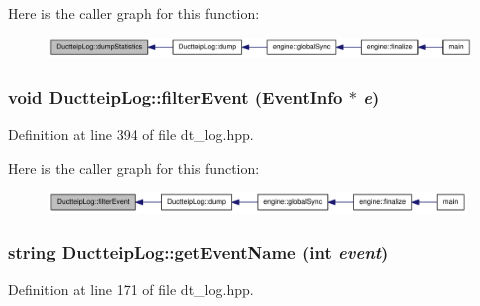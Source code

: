 Here is the caller graph for this function:\nopagebreak
\begin{figure}[H]
\begin{center}
\leavevmode
\includegraphics[width=324pt]{class_ductteip_log_a7f6153345afe4d8ecf0e4f066c77fb33_icgraph}
\end{center}
\end{figure}
\hypertarget{class_ductteip_log_a91792b3bdcea6336ee43c7da8872879f}{
\subsubsection[{filterEvent}]{\setlength{\rightskip}{0pt plus 5cm}void DuctteipLog::filterEvent ({\bf EventInfo} $\ast$ {\em e})}}
\label{class_ductteip_log_a91792b3bdcea6336ee43c7da8872879f}


Definition at line 394 of file dt\_\-log.hpp.

Here is the caller graph for this function:\nopagebreak
\begin{figure}[H]
\begin{center}
\leavevmode
\includegraphics[width=314pt]{class_ductteip_log_a91792b3bdcea6336ee43c7da8872879f_icgraph}
\end{center}
\end{figure}
\hypertarget{class_ductteip_log_a080df86b3f7167341da836494af41822}{
\subsubsection[{getEventName}]{\setlength{\rightskip}{0pt plus 5cm}string DuctteipLog::getEventName (int {\em event})}}
\label{class_ductteip_log_a080df86b3f7167341da836494af41822}


Definition at line 171 of file dt\_\-log.hpp.

